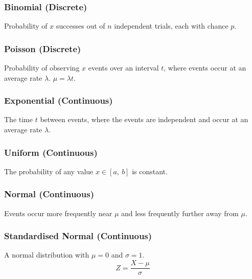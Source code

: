 \documentclass{article}
\begin{document}
\begin{minipage}{62.39259259mm}
    \subsubsection*{Binomial (Discrete)}
    Probability of $x$ successes out of $n$ independent trials, each with chance $p$.
    \subsubsection*{Poisson (Discrete)}
    Probability of observing $x$ events over an interval $t$, where events occur at an
    average rate $\lambda$. $\mu = \lambda t$.
    \subsubsection*{Exponential (Continuous)}
    The time $t$ between events, where the events are independent and occur at an average rate $\lambda$.
    \subsubsection*{Uniform (Continuous)}
    The probability of any value $x\in\left[ a,\: b \right]$ is constant.
    \subsubsection*{Normal (Continuous)}
    Events occur more frequently near $\mu$ and less frequently further away from $\mu$.
    \subsubsection*{Standardised Normal (Continuous)}
    A normal distribution with $\mu=0$ and $\sigma=1$.
    \begin{equation*}
        Z = \frac{X-\mu}{\sigma}
    \end{equation*}
\end{minipage}
\end{document}
